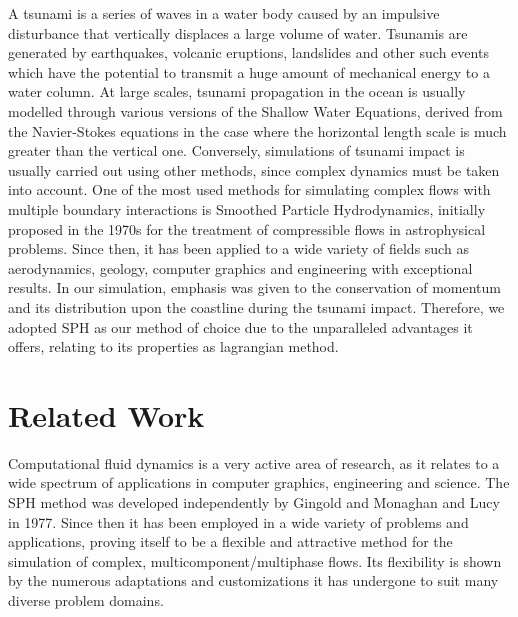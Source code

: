 \documentclass{llncs}
\begin{document}
A tsunami is a series of waves in a water body caused by an impulsive disturbance that
vertically displaces a large volume of water. Tsunamis are generated by earthquakes,
volcanic eruptions, landslides and other such events which have the potential to transmit
a huge amount of mechanical energy to a water column. At large scales, tsunami propagation
in the ocean is usually modelled through various versions of the Shallow Water Equations,
derived from the Navier-Stokes equations in the case where the horizontal length scale is
much greater than the vertical one. Conversely, simulations of tsunami impact is usually
carried out using other methods, since complex dynamics must be taken into account. One of
the most used methods for simulating complex flows with multiple boundary interactions is
Smoothed Particle Hydrodynamics, initially proposed in the 1970s for the treatment of
compressible flows in astrophysical problems. Since then, it has been applied to a wide
variety of fields such as aerodynamics, geology, computer graphics and engineering with
exceptional results. In our simulation, emphasis was given to the conservation of momentum
and its distribution upon the coastline during the tsunami impact. Therefore, we adopted
SPH as our method of choice due to the unparalleled advantages it offers, relating to its
properties as lagrangian method.

\section{Related Work}
Computational fluid dynamics is a very active area of research, as it relates to a wide
spectrum of applications in computer graphics, engineering and science. The SPH method was
developed independently by Gingold and Monaghan \cite{gingold1977375} and Lucy
\cite{lucy19771013} in 1977. Since then it has been employed in a wide variety of problems
and applications, proving itself to be a flexible and attractive method for the simulation
of complex, multicomponent/multiphase flows. Its flexibility is shown by the numerous
adaptations and customizations it has undergone to suit many diverse problem domains.
\end{document}
